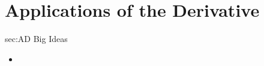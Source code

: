 \chapter{Applications of the Derivative}
\label{chap:AD}

\begin{bigideas}{sec:AD Big Ideas}
\begin{itemize}
  \item 
\end{itemize}
\end{bigideas}